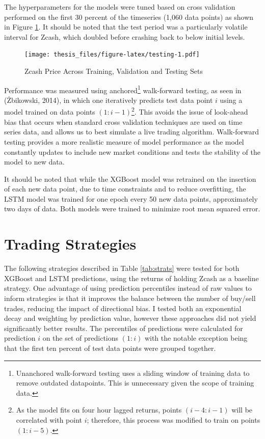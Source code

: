 \documentclass[12pt,twoside]{dukestatscithesis}
\begin{document}
The hyperparameters for the models were tuned based on cross validation
performed on the first 30 percent of the timeseries (1,060 data points)
as shown in Figure \ref{fig:testing}. It should be noted that the test
period was a particularly volatile interval for Zcash, which doubled
before crashing back to below initial levels.
\begin{figure}
\centering
\texttt{[image: thesis\_files/figure-latex/testing-1.pdf]}
\caption{\label{fig:testing}Zcash Price Across Training, Validation and
Testing Sets}
\end{figure}
Performance was measured using anchored\footnote{Unanchored walk-forward
  testing uses a sliding window of training data to remove outdated
  datapoints. This is unnecessary given the scope of training data.}
walk-forward testing, as seen in (Żbikowski, 2014), in which one
iteratively predicts test data point \(i\) using a model trained on data
points \((1:i-1)\)\footnote{As the model fits on four hour lagged
  returns, points \((i-4:i-1)\) will be correlated with point \(i\);
  therefore, this process was modified to train on points \((1:i-5)\).}.
This avoids the issue of look-ahead bias that occurs when standard cross
validation techniques are used on time series data, and allows us to
best simulate a live trading algorithm. Walk-forward testing provides a
more realistic measure of model performance as the model constantly
updates to include new market conditions and tests the stability of the
model to new data.

It should be noted that while the XGBoost model was retrained on the
insertion of each new data point, due to time constraints and to reduce
overfitting, the LSTM model was trained for one epoch every 50 new data
points, approximately two days of data. Both models were trained to
minimize root mean squared error.

\section{Trading Strategies}\label{trading-strategies}

The following strategies described in Table \ref{tab:strats} were tested
for both XGBoost and LSTM predictions, using the returns of holding
Zcash as a baseline strategy. One advantage of using prediction
percentiles instead of raw values to inform strategies is that it
improves the balance between the number of buy/sell trades, reducing the
impact of directional bias. I tested both an exponential decay and
weighting by prediction value, however these approaches did not yield
significantly better results. The percentiles of predictions were
calculated for prediction \(i\) on the set of predictions \((1:i)\) with
the notable exception being that the first ten percent of test data
points were grouped together.
\end{document}
